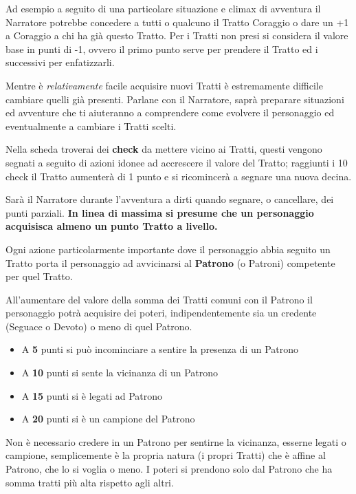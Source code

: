 \begin{multicols}{2}
Ad esempio a seguito di una particolare situazione e climax di avventura il Narratore potrebbe concedere a tutti o qualcuno il Tratto Coraggio o dare un +1 a Coraggio a chi ha già questo Tratto. Per i Tratti non presi si considera il valore base in punti di -1, ovvero il primo punto serve per prendere il Tratto ed i successivi per enfatizzarli.

Mentre è \emph{relativamente} facile acquisire nuovi Tratti è estremamente difficile cambiare quelli già presenti. Parlane con il Narratore, saprà preparare situazioni ed avventure che ti aiuteranno a comprendere come evolvere il personaggio ed eventualmente a cambiare i Tratti scelti.

Nella scheda troverai dei \textbf{check} da mettere vicino ai Tratti, questi vengono segnati a seguito di azioni idonee ad accrescere il valore del Tratto; raggiunti i 10 check il Tratto aumenterà di 1 punto e si ricomincerà a segnare una nuova decina.

Sarà il Narratore durante l'avventura a dirti quando segnare, o cancellare, dei punti parziali. \textbf{In linea di massima si presume che un personaggio acquisisca almeno un punto Tratto a livello.}

Ogni azione particolarmente importante dove il personaggio abbia seguito un Tratto porta il personaggio ad avvicinarsi al \textbf{Patrono} (o Patroni) competente per quel Tratto.

All'aumentare del valore della somma dei Tratti comuni con il Patrono il personaggio potrà acquisire dei poteri, indipendentemente sia un credente (Seguace o Devoto) o meno di quel Patrono.

\noindent\begin{itemize}[leftmargin=*] \setlength{\itemsep}{0pt}
\item A \textbf{5} punti si può incominciare a sentire la presenza di un Patrono

\item A \textbf{10} punti si sente la vicinanza di un Patrono

\item A \textbf{15} punti si è legati ad Patrono

\item A \textbf{20} punti si è un campione del Patrono
\end{itemize}

Non è necessario credere in un Patrono per sentirne la vicinanza, esserne legati o campione, semplicemente è la propria natura (i propri Tratti) che è affine al Patrono, che lo si voglia o meno. I poteri si prendono solo dal Patrono che ha somma tratti più alta rispetto agli altri.


\end{multicols}
